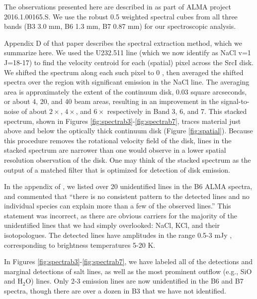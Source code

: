 \documentclass[twocolumn]{aastex62}
\newcommand{\sourcei}{SrcI\xspace}
\begin{document}
The observations presented here are described in \citet{Ginsburg2018b} as part
of ALMA project 2016.1.00165.S.  We use the robust 0.5 weighted spectral cubes
from all three bands (B3 3.0 mm, B6 1.3 mm, B7 0.87 mm) for our spectroscopic analysis.

Appendix D of that paper describes the spectral extraction method, which we
summarize here.  We used the U232.511 line (which we now identify as NaCl v=1
J=18-17) to find the velocity centroid for each (spatial) pixel across the
\sourcei disk.  We shifted the spectrum along each such pixel to 0 \kms, then
averaged the shifted spectra over the region with significant emission in the
NaCl line.  The averaging area is approximately the extent of the continuum
disk, 0.03 square arcseconds, or about 4, 20, and 40  beam areas, resulting in
an improvement in the signal-to-noise of about $2\times$, $4\times$, and
$6\times$ respectively in Band 3, 6, and 7.  This stacked spectrum, shown in
Figures \ref{fig:spectrab3}-\ref{fig:spectrab7}, traces material just above and
below the optically thick continuum disk (Figure \ref{fig:spatial}).  Because
this procedure removes the rotational velocity field of the disk, lines in the
stacked spectrum are narrower than one would observe in a lower spatial
resolution observation of the disk.  One may think of the stacked spectrum as
the output of a matched filter that is optimized for detection of disk
emission.



In the appendix of \citet{Ginsburg2018b}, we listed over 20 unidentified 
lines in the B6 ALMA spectra, and commented that ``there is no
consistent pattern to the detected lines and no individual species can explain
more than a few of the observed lines.''  This statement was incorrect, as
there are obvious carriers for the majority of the unidentified lines that we
had simply overlooked: NaCl, KCl, and their isotopologues.  The
detected lines have amplitudes in the range 0.5-3 mJy \perbeam, corresponding
to brightness temperatures 5-20 K.  

In Figures \ref{fig:spectrab3}-\ref{fig:spectrab7}, we have labeled all of the
detections and marginal detections of salt lines, as well as the most prominent
outflow (e.g., SiO and H$_2$O) lines.  Only 2-3 emission lines are now
unidentified in the B6 and B7 spectra, though there are over a dozen in B3 that
we have not identified. 
\end{document}
